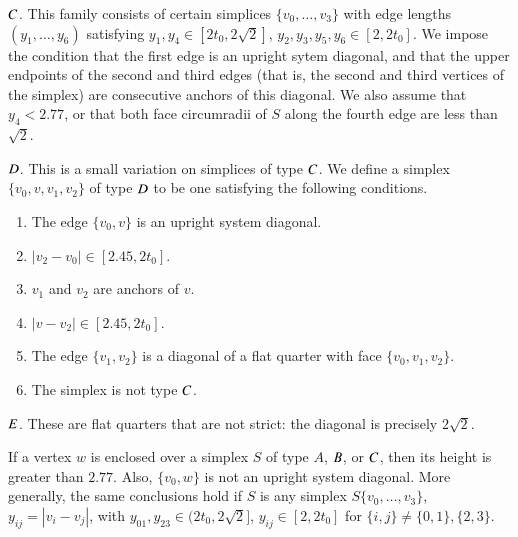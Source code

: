$C$.  This family consists of certain simplices $\{v_0,\ldots,v_3\}$
with edge lengths $(y_1,\ldots,y_6)$ satisfying
    $y_1,y_4\in[2t_0,2\sqrt{2}]$, $y_2,y_3,y_5,y_6\in[2,2t_0]$.
We impose the condition that the first edge is an upright
sytem diagonal, and that the upper
endpoints of the second and third edges (that is, the second and
third vertices of the simplex) are consecutive anchors of this
diagonal. We also assume that $y_4< 2.77$, or that both face
circumradii of $S$ along the fourth edge are less than $\sqrt{2}$.

$D$.  This is
a small variation on simplices of type $C$.  
We define a simplex $\{v_0,v,v_1,v_2\}$ of type $D$
to be one satisfying the following conditions.
    \begin{enumerate}
    \item The edge $\{v_0,v\}$ is an upright system diagonal.
    \item $|v_2-v_0|\in[2.45,2t_0]$.
    \item $v_1$ and $v_2$ are anchors of $v$.
    \item $|v-v_2|\in [2.45,2t_0]$.
    \item The edge $\{v_1,v_2\}$
    is a diagonal of a flat quarter with face $\{v_0,v_1,v_2\}$.
    \item The simplex is not type $C$.
    \end{enumerate}



$E$.  These are flat quarters that are not strict: the diagonal is precisely
$2\sqrt2$.

\begin{lemma}
If a vertex $w$ is enclosed over a simplex $S$ of type $A$, $B$,
or $C$, then its height is greater than $2.77$.  Also, $\{v_0,w\}$
is not an upright system diagonal.
More generally, the same conclusions hold if $S$ is any simplex
$S\{v_0,\ldots,v_3\}$, $y_{ij}=|v_i-v_j|$, with $y_{01},y_{23}\in(2t_0,2\sqrt{2}]$,
$y_{ij}\in[2,2t_0]$ for $\{i,j\}\ne\{0,1\},\{2,3\}$.
\end{lemma}

